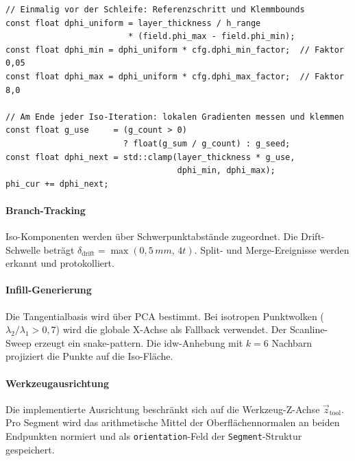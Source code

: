                     \begin{lstlisting}[style=cppStyle, caption={Adaptive Schrittweite der Iso-Extraktion.}, label={lst:impl-crystal-adaptive}]
// Einmalig vor der Schleife: Referenzschritt und Klemmbounds
const float dphi_uniform = layer_thickness / h_range
                         * (field.phi_max - field.phi_min);
const float dphi_min = dphi_uniform * cfg.dphi_min_factor;  // Faktor 0,05
const float dphi_max = dphi_uniform * cfg.dphi_max_factor;  // Faktor 8,0

// Am Ende jeder Iso-Iteration: lokalen Gradienten messen und klemmen
const float g_use     = (g_count > 0)
                        ? float(g_sum / g_count) : g_seed;
const float dphi_next = std::clamp(layer_thickness * g_use,
                                   dphi_min, dphi_max);
phi_cur += dphi_next;
                    \end{lstlisting}

                \paragraph{Branch-Tracking}\label{para:impl-crystal-branch-tracking}
                    Iso-Komponenten werden über Schwerpunktabstände zugeordnet.
                    Die Drift-Schwelle beträgt $\delta_\mathrm{drift} = \max(0{,}5\,\si{mm},\,4t)$.
                    Split- und Merge-Ereignisse werden erkannt und protokolliert.

                \paragraph{Infill-Generierung}\label{para:impl-crystal-infill}
                    Die Tangentialbasis wird über \ac{PCA} bestimmt.
                    Bei isotropen Punktwolken ($\lambda_2/\lambda_1 > 0{,}7$) wird die globale X-Achse als Fallback verwendet.
                    Der Scanline-Sweep erzeugt ein \gls{snake-pattern}.
                    Die \gls{idw}-Anhebung mit $k = 6$ Nachbarn projiziert die Punkte auf die Iso-Fläche.

                \paragraph{Werkzeugausrichtung}\label{para:impl-crystal-pose}
                    Die implementierte Ausrichtung beschränkt sich auf die Werkzeug-Z-Achse $\vec{z}_\mathrm{tool}$.
                    Pro Segment wird das arithmetische Mittel der Oberflächennormalen an beiden Endpunkten
                    normiert und als \texttt{orientation}-Feld der \texttt{Segment}-Struktur gespeichert.

